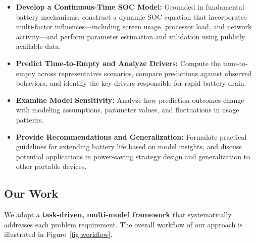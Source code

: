 \begin{itemize}
    \item \textbf{Develop a Continuous-Time SOC Model:} Grounded in fundamental battery mechanisms, construct a dynamic SOC equation that incorporates multi-factor influences---including screen usage, processor load, and network activity---and perform parameter estimation and validation using publicly available data.

    \item \textbf{Predict Time-to-Empty and Analyze Drivers:} Compute the time-to-empty across representative scenarios, compare predictions against observed behaviors, and identify the key drivers responsible for rapid battery drain.

    \item \textbf{Examine Model Sensitivity:} Analyze how prediction outcomes change with modeling assumptions, parameter values, and fluctuations in usage patterns.

    \item \textbf{Provide Recommendations and Generalization:} Formulate practical guidelines for extending battery life based on model insights, and discuss potential applications in power-saving strategy design and generalization to other portable devices.
\end{itemize}

\subsection{Our Work}
\label{subsec:our-work}

\hspace*{\parindent}We adopt a \textbf{task-driven, multi-model framework} that systematically addresses each problem requirement. The overall workflow of our approach is illustrated in Figure~\ref{fig:workflow}.

